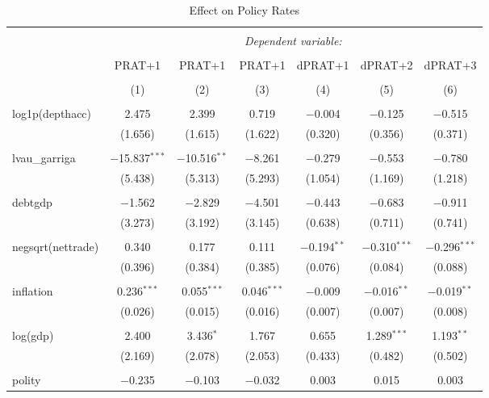 \documentclass[]{article}
\begin{document}
\begin{table}[!htbp] \centering 
  \caption{Effect on Policy Rates} 
  \label{} 
\begin{tabular}{@{\extracolsep{5pt}}lcccccc} 
\\[-1.8ex]\hline 
\hline \\[-1.8ex] 
 & \multicolumn{6}{c}{\textit{Dependent variable:}} \\ 
\cline{2-7} 
\\[-1.8ex] & PRAT+1 & PRAT+1 & PRAT+1 & dPRAT+1 & dPRAT+2 & dPRAT+3 \\ 
\\[-1.8ex] & (1) & (2) & (3) & (4) & (5) & (6)\\ 
\hline \\[-1.8ex] 
 log1p(depthacc) & 2.475 & 2.399 & 0.719 & $-$0.004 & $-$0.125 & $-$0.515 \\ 
  & (1.656) & (1.615) & (1.622) & (0.320) & (0.356) & (0.371) \\ 
  & & & & & & \\ 
 lvau\_garriga & $-$15.837$^{***}$ & $-$10.516$^{**}$ & $-$8.261 & $-$0.279 & $-$0.553 & $-$0.780 \\ 
  & (5.438) & (5.313) & (5.293) & (1.054) & (1.169) & (1.218) \\ 
  & & & & & & \\ 
 debtgdp & $-$1.562 & $-$2.829 & $-$4.501 & $-$0.443 & $-$0.683 & $-$0.911 \\ 
  & (3.273) & (3.192) & (3.145) & (0.638) & (0.711) & (0.741) \\ 
  & & & & & & \\ 
 negsqrt(nettrade) & 0.340 & 0.177 & 0.111 & $-$0.194$^{**}$ & $-$0.310$^{***}$ & $-$0.296$^{***}$ \\ 
  & (0.396) & (0.384) & (0.385) & (0.076) & (0.084) & (0.088) \\ 
  & & & & & & \\ 
 inflation & 0.236$^{***}$ & 0.055$^{***}$ & 0.046$^{***}$ & $-$0.009 & $-$0.016$^{**}$ & $-$0.019$^{**}$ \\ 
  & (0.026) & (0.015) & (0.016) & (0.007) & (0.007) & (0.008) \\ 
  & & & & & & \\ 
 log(gdp) & 2.400 & 3.436$^{*}$ & 1.767 & 0.655 & 1.289$^{***}$ & 1.193$^{**}$ \\ 
  & (2.169) & (2.078) & (2.053) & (0.433) & (0.482) & (0.502) \\ 
  & & & & & & \\ 
 polity & $-$0.235 & $-$0.103 & $-$0.032 & 0.003 & 0.015 & 0.003 \\ 

\end{tabular}
\end{table}
\end{document}
